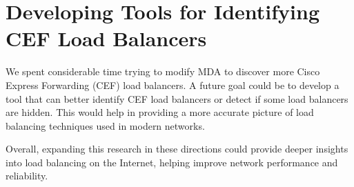 \documentclass[12pt]{cwru_thesis}
\begin{document}
\section*{Developing Tools for Identifying CEF Load Balancers}

We spent considerable time trying to modify MDA to discover more Cisco Express Forwarding (CEF) load balancers. A future goal could be to develop a tool that can better identify CEF load balancers or detect if some load balancers are hidden. This would help in providing a more accurate picture of load balancing techniques used in modern networks.

Overall, expanding this research in these directions could provide deeper insights into load balancing on the Internet, helping improve network performance and reliability.



\printbibliography[heading=bibintoc]
\end{document}
